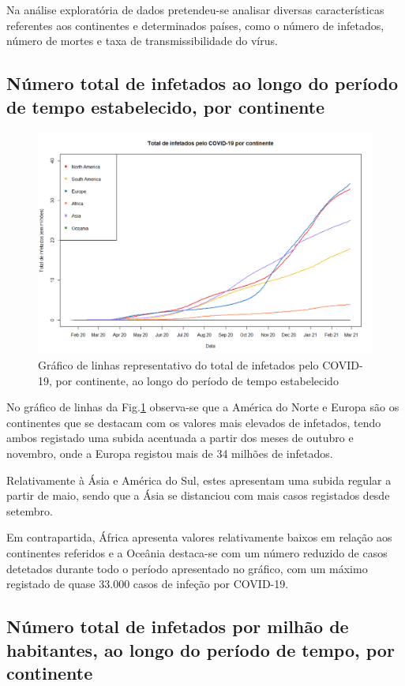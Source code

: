 \documentclass[conference]{IEEEtran}
\begin{document}
Na análise exploratória de dados pretendeu-se analisar diversas características referentes aos continentes e determinados países, como o número de infetados, número de mortes e taxa de transmissibilidade do vírus.

\subsection{Número total de infetados ao longo do período de tempo estabelecido, por continente}

\begin{figure}[htbp]
\centerline{\includegraphics[width=0.95\columnwidth]{images/01.a.png}}
\caption{Gráfico de linhas representativo do total de infetados pelo COVID-19, por continente, ao longo do período de tempo estabelecido}
\label{1a}
\end{figure}

No gráfico de linhas da Fig.\ref{1a} observa-se que a América do Norte e Europa são os continentes que se destacam com os valores mais elevados de infetados, tendo ambos registado uma subida acentuada a partir dos meses de outubro e novembro, onde a Europa registou mais de 34 milhões de infetados. 

Relativamente à Ásia e América do Sul, estes apresentam uma subida regular a partir de maio, sendo que a Ásia se distanciou com mais casos registados desde setembro.

Em contrapartida, África apresenta valores relativamente baixos em relação aos continentes referidos e a Oceânia destaca-se com um número reduzido de casos detetados durante todo o período apresentado no gráfico, com um máximo registado de quase 33.000 casos de infeção por COVID-19.


\subsection{Número total de infetados por milhão de habitantes, ao longo do período de tempo, por continente}
\end{document}
